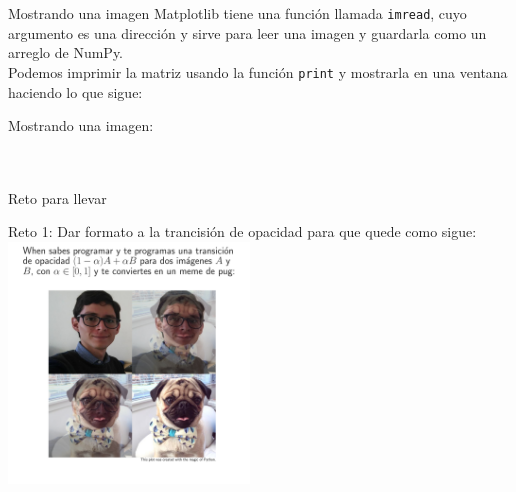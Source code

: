 \documentclass[usenames,dvipsnames]{beamer}
\begin{document}
  \begin{frame}{Mostrando una imagen}
    Matplotlib tiene una función llamada \texttt{imread}, cuyo argumento es una
    dirección y sirve para leer una imagen y guardarla como un arreglo de NumPy.\\
    \vspace*{0.3cm}
    Podemos imprimir la matriz usando la función \texttt{print} y mostrarla en
    una ventana haciendo lo que sigue:
    \begin{block}{Mostrando una imagen:}
      \\
      \\
      \\
      \vspace*{0.5cm}
    \end{block}
  \end{frame}

  \begin{frame}{Reto para llevar}
    \vspace*{0.5cm}
    \begin{block}{Reto 1:}
      Dar formato a la trancisión de opacidad para que quede como sigue:\\
      \centering
      \includegraphics[width=0.48\textwidth]{imgs/meme}
      \vspace*{0.5cm}
    \end{block}
  \end{frame}
\end{document}
